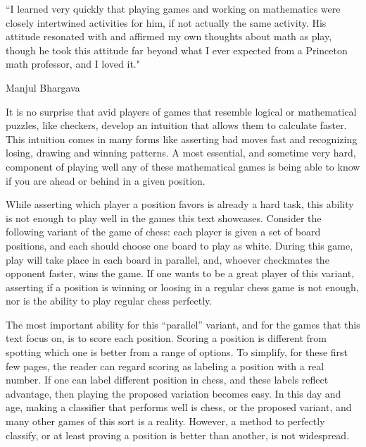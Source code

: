 \renewcommand{\textflush}{flushepinormal}
\setlength{}
\epigraph{``I learned very quickly that playing games and working on mathematics were closely intertwined activities for him, if not actually the same activity. His attitude resonated with and affirmed my own thoughts about math as play, though he took this attitude far beyond what I ever expected from a Princeton math professor, and I loved it."}{Manjul Bhargava \footnotemark}




It is no surprise that avid players of games that resemble logical or
mathematical puzzles, like checkers, develop an intuition that allows
them to calculate faster. This intuition comes in many forms like
asserting bad moves fast and recognizing losing, drawing and winning
patterns. A most essential, and sometime very hard, component of
playing well any of these mathematical games is being able to know if
you are ahead or behind in a given position.

While asserting which player a position favors is already a hard task,
this ability is not enough to play well in the games this text
showcases. Consider the following variant of the game of chess: each
player is given a set of board positions, and each should choose one
board to play as white. During this game, play will take place in each
board in parallel, and, whoever checkmates the opponent faster, wins
the game. If one wants to be a great player of this variant, asserting
if a position is winning or loosing in a regular chess game is not
enough, nor is the ability to play regular chess perfectly.

The most important ability for this ``parallel'' variant, 
and for the games that this text focus on, is
to score each position.
Scoring a position is different from spotting which one
is better from a range of options.
To simplify, for these first few pages, the reader can
regard scoring as labeling a position with a real number.
If one can label different position in chess, and
these labels reflect advantage, 
then playing the proposed variation becomes easy.
In this day and age, making a 
classifier that performs well is chess,
or the proposed variant, and
many other games of this sort is a reality.
However, a method to perfectly classify, or at least proving
a position is better than another, is not widespread.
 
